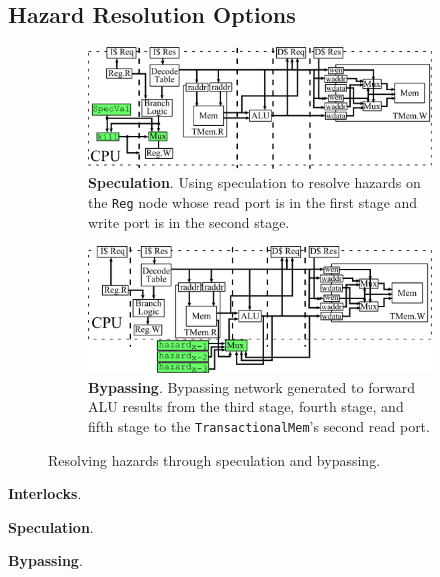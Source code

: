 \subsection{Hazard Resolution Options}
\begin{figure}[htb]
\centering
  \begin{subfigure}[t]{0.8\textwidth}
  \centering
  \includegraphics[width=\textwidth]{figures/pipelinespec.pdf}
  \caption{{\bf Speculation}. Using speculation to resolve hazards on
    the {\tt Reg} node whose read port is in the first stage and write port
  is in the second stage.}
  \label{fig:spec}
  \end{subfigure}
  \begin{subfigure}[t]{0.8\textwidth}
  \vspace{20pt}
  \centering
  \includegraphics[width=\textwidth]{figures/pipelinebypass.pdf}
  \caption{{\bf Bypassing}. Bypassing network generated to forward ALU
  results from the third stage, fourth stage, and fifth stage to the
  {\tt TransactionalMem}'s second read port.}
  \label{fig:bypass}
  \end{subfigure}
\caption{Resolving hazards through speculation and bypassing.}
\label{fig:specbyp}
\end{figure}

{\bf Interlocks}. 

{\bf Speculation}. 

{\bf Bypassing}. 

